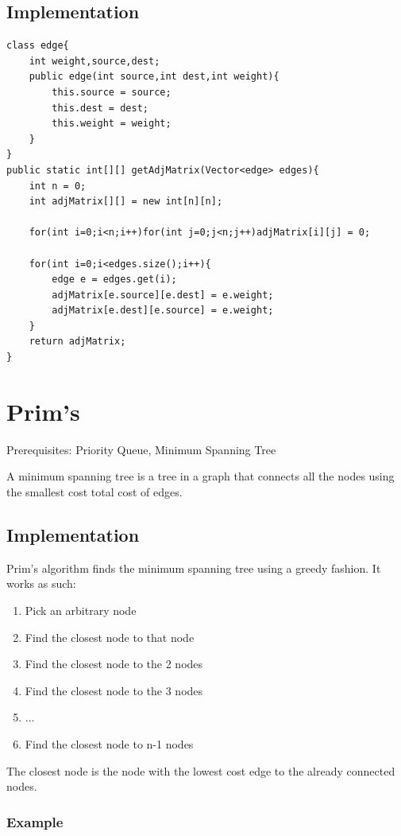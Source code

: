 \documentclass[11pt,oneside]{book}
\begin{document}
\subsection{Implementation}

\begin{lstlisting}
class edge{
    int weight,source,dest;
    public edge(int source,int dest,int weight){
        this.source = source;
        this.dest = dest;
        this.weight = weight;
    }
}
public static int[][] getAdjMatrix(Vector<edge> edges){
    int n = 0;
    int adjMatrix[][] = new int[n][n];
    
    for(int i=0;i<n;i++)for(int j=0;j<n;j++)adjMatrix[i][j] = 0;
    
    for(int i=0;i<edges.size();i++){
        edge e = edges.get(i);
        adjMatrix[e.source][e.dest] = e.weight;
        adjMatrix[e.dest][e.source] = e.weight;
    }
    return adjMatrix;
}
\end{lstlisting}
\section{Prim's}Prerequisites:  Priority Queue, Minimum Spanning Tree

A minimum spanning tree is a tree in a graph that connects all the nodes using the smallest cost total cost of edges.

\subsection{Implementation}

Prim's algorithm finds the minimum spanning tree using a greedy fashion. It works as such:

\begin{enumerate}
\item Pick an arbitrary node
\item Find the closest node to that node
\item Find the closest node to the 2 nodes
\item Find the closest node to the 3 nodes
\item ...
\item Find the closest node to n-1 nodes
\end{enumerate}

The closest node is the node with the lowest cost edge to the already connected nodes.

\subsubsection{Example}
\end{document}
